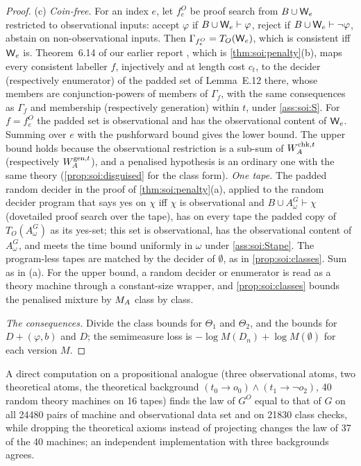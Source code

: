 \begin{proof}
(c) \emph{Coin-free.} For an index $e$, let $f^O_e$ be proof search from $B\cup\mathsf{W}_{e}$ restricted to observational inputs: accept $\varphi$ if $B\cup\mathsf{W}_{e}\vdash\varphi$, reject if $B\cup\mathsf{W}_{e}\vdash\neg\varphi$, abstain on non-observational inputs. Then $\Gamma_{f^O_e}=T_O(\mathsf{W}_{e})$, which is consistent iff $\mathsf{W}_{e}$ is. Theorem~6.14 of our earlier report \citep{claude2026axiominduction}, which is \cref{thm:soi:penalty}(b), maps every consistent labeller $f$, injectively and at length cost $c_t$, to the decider (respectively enumerator) of the padded set of Lemma~E.12 there, whose members are conjunction-powers of members of $\Gamma_f$, with the same consequences as $\Gamma_f$ and membership (respectively generation) within $t$, under \cref{ass:soi:S}. For $f=f^O_e$ the padded set is observational and has the observational content of $\mathsf{W}_{e}$. Summing over $e$ with the pushforward bound gives the lower bound. The upper bound holds because the observational restriction is a sub-sum of $W_{A}^{\mathrm{chk},t}$ (respectively $W_{A}^{\mathrm{gen},t}$), and a penalised hypothesis is an ordinary one with the same theory (\cref{prop:soi:disguised} for the class form). \emph{One tape.} The padded random decider in the proof of \cref{thm:soi:penalty}(a), applied to the random decider program that says yes on $\chi$ iff $\chi$ is observational and $B\cup A^G_\omega\vdash\chi$ (dovetailed proof search over the tape), has on every tape the padded copy of $T_O(A^G_\omega)$ as its yes-set; this set is observational, has the observational content of $A^G_\omega$, and meets the time bound uniformly in $\omega$ under \cref{ass:soi:Stape}. The program-less tapes are matched by the decider of $\emptyset$, as in \cref{prop:soi:classes}. Sum as in (a). For the upper bound, a random decider or enumerator is read as a theory machine through a constant-size wrapper, and \cref{prop:soi:classes} bounds the penalised mixture by $M_{A}$ class by class.

\emph{The consequences.} Divide the class bounds for $\Theta_1$ and $\Theta_2$, and the bounds for $D+(\varphi,b)$ and $D$; the semimeasure loss is $-\log M(D_n)+\log M(\emptyset)$ for each version $M$.
\end{proof}

A direct computation on a propositional analogue (three observational atoms, two theoretical atoms, the theoretical background $(t_0\to o_0)\wedge(t_1\to\neg o_2)$, 40 random theory machines on 16 tapes) finds the law of $G^O$ equal to that of $G$ on all 24480 pairs of machine and observational data set and on 21830 class checks, while dropping the theoretical axioms instead of projecting changes the law of 37 of the 40 machines; an independent implementation with three backgrounds agrees.

